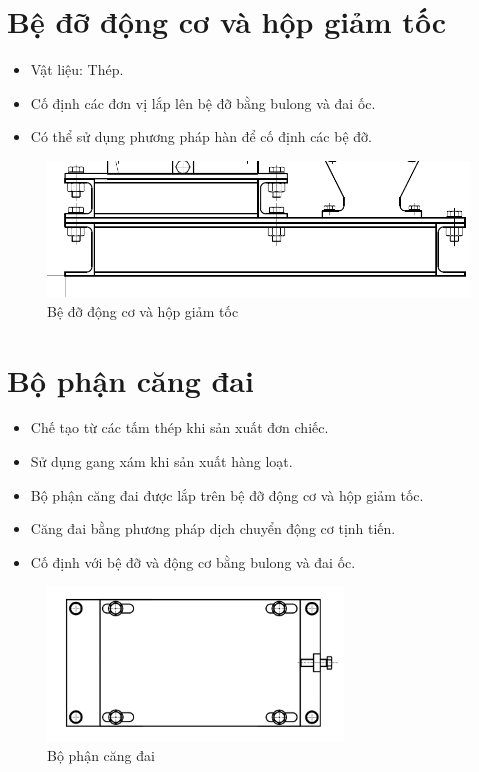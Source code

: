 \section{Bệ đỡ động cơ và hộp giảm tốc}
\begin{itemize}
    \item Vật liệu: Thép.
    \item Cố định các đơn vị lắp lên bệ đỡ bằng bulong và đai ốc.
    \item Có thể sử dụng phương pháp hàn để cố định các bệ đỡ.
\end{itemize}
\begin{figure}[H]
    \centering
    \includegraphics[width=1\textwidth]{pictures/be.png}
    \caption{Bệ đỡ động cơ và hộp giảm tốc}
\end{figure}

\section{Bộ phận căng đai}
\begin{itemize}
    \item Chế tạo từ các tấm thép khi sản xuất đơn chiếc.
    \item Sử dụng gang xám khi sản xuất hàng loạt.
    \item Bộ phận căng đai được lắp trên bệ đỡ động cơ và hộp giảm tốc.
    \item Căng đai bằng phương pháp dịch chuyển động cơ tịnh tiến.
    \item Cố định với bệ đỡ và động cơ bằng bulong và đai ốc.
\end{itemize}
\begin{figure}[H]
    \centering
    \includegraphics[width=0.7\textwidth]{pictures/cangdai.png}
    \caption{Bộ phận căng đai}
\end{figure}


